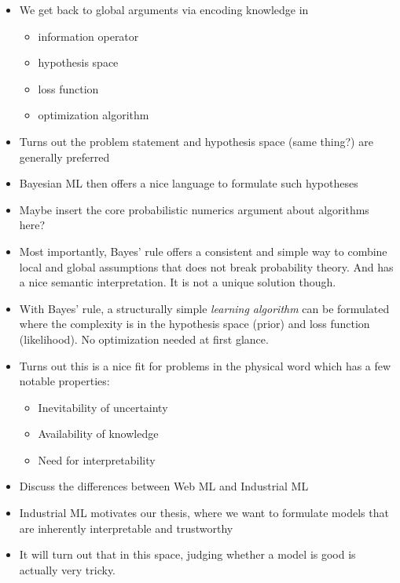\begin{itemize}
    \item We get back to global arguments via encoding knowledge in
          \begin{itemize}
              \item information operator
              \item hypothesis space
              \item loss function
              \item optimization algorithm
          \end{itemize}
    \item Turns out the problem statement and hypothesis space (same thing?) are generally preferred
    \item Bayesian ML then offers a nice language to formulate such hypotheses
    \item Maybe insert the core probabilistic numerics argument about algorithms here?
    \item Most importantly, Bayes' rule offers a consistent and simple way to combine local and global assumptions that does not break probability theory.
          And has a nice semantic interpretation.
          It is not a unique solution though.
    \item With Bayes' rule, a structurally simple \emph{learning algorithm} can be formulated where the complexity is in the hypothesis space (prior) and loss function (likelihood). No optimization needed at first glance.
    \item Turns out this is a nice fit for problems in the physical word which has a few notable properties:
          \begin{itemize}
              \item Inevitability of uncertainty
              \item Availability of knowledge
              \item Need for interpretability
          \end{itemize}
    \item Discuss the differences between Web ML and Industrial ML
    \item Industrial ML motivates our thesis, where we want to formulate models that are inherently interpretable and trustworthy
    \item It will turn out that in this space, judging whether a model is good is actually very tricky.
\end{itemize}
